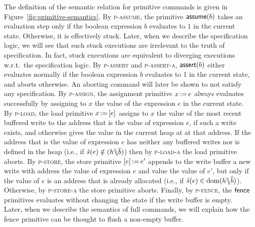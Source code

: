 \documentclass[11pt]{report}
\begin{document}
The definition of the semantic relation for primitive commands is given in Figure~\ref{fig:primitive-semantics}. By \textsc{p-assume}, the primitive $\operatorname{\mathsf{assume}}(b)$ takes an evaluation step only if the boolean expression $b$ evaluates to $1$ in the current state. Otherwise, it is effectively stuck. Later, when we describe the specification logic, we will see that such stuck executions are irrelevant to the truth of specification. In fact, stuck executions are equivalent to diverging executions w.r.t.\ the specification logic. By \textsc{p-assert} and \textsc{p-assert-a}, $\operatorname{\mathsf{assert}}(b)$ either evaluates normally if the boolean expression $b$ evaluates to 1 in the current state, and aborts otherwise. An aborting command will later be shown to not satisfy any specification. By \textsc{p-assign}, the assignment primitive $x \operatorname{:\!=} e$ always evaluates successfully by assigning to $x$ the value of the expression $e$ in the current state. By \textsc{p-load}, the load primitive $x \operatorname{:\!=} \left[ e \right]$ assigns to $x$ the value of the most recent buffered write to the address that is the value of expression $e$, if such a write exists, and otherwise gives the value in the current heap at at that address. If the address that is the value of expression $e$ has neither any buffered writes nor is defined in the heap (i.e., if $\hat{s}(e) \notin (h \backslash\!\!\backslash \overline{b})$) then by \textsc{p-load-a} the load primitive aborts. By \textsc{p-store}, the store primitive $\left[ e \right] \operatorname{:\!=} e'$ appends to the write buffer a new write with address the value of expression $e$ and value the value of $e'$, but only if the value of $e$ is an address that is already allocated (i.e., if $\hat{s}(e) \in \operatorname{\mathrm{dom}}(h \backslash\!\!\backslash \overline{b})$). Otherwise, by \textsc{p-store-a} the store primitive aborts. Finally, by \textsc{p-fence}, the $\operatorname{\mathsf{fence}}$ primitives evaluates without changing the state if the write buffer is empty. Later, when we describe the semantics of full commands, we will explain how the fence primitive can be thought to flush a non-empty buffer. 
\end{document}
